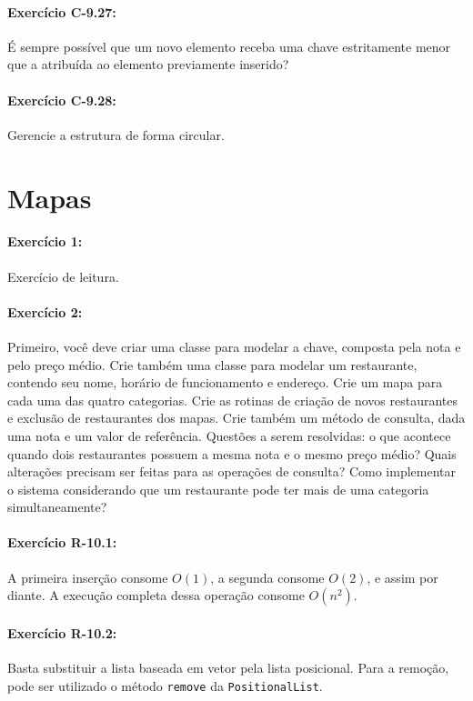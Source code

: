\paragraph{Exercício C-9.27:}
É sempre possível que um novo elemento receba uma chave estritamente menor que a atribuída ao elemento previamente inserido?

\paragraph{Exercício C-9.28:}
Gerencie a estrutura de forma circular.

\section{Mapas}

\paragraph{Exercício 1:}
Exercício de leitura.

\paragraph{Exercício 2:}
Primeiro, você deve criar uma classe para modelar a chave, composta pela nota e pelo preço médio. Crie também uma classe para modelar um restaurante, contendo seu nome, horário de funcionamento e endereço. Crie um mapa para cada uma das quatro categorias. Crie as rotinas de criação de novos restaurantes e exclusão de restaurantes dos mapas. Crie também um método de consulta, dada uma nota e um valor de referência. Questões a serem resolvidas: o que acontece quando dois restaurantes possuem a mesma nota e o mesmo preço médio? Quais alterações precisam ser feitas para as operações de consulta? Como implementar o sistema considerando que um restaurante pode ter mais de uma categoria simultaneamente?

\paragraph{Exercício R-10.1:}
A primeira inserção consome $O(1)$, a segunda consome $O(2)$, e assim por diante. A execução completa dessa operação consome $O(n^2)$.

\paragraph{Exercício R-10.2:}
Basta substituir a lista baseada em vetor pela lista posicional. Para a remoção, pode ser utilizado o método \texttt{remove} da \texttt{PositionalList}.

